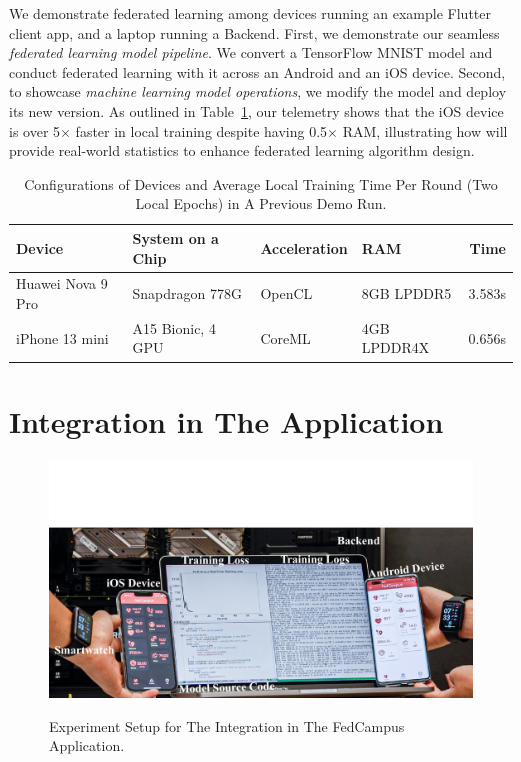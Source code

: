We demonstrate federated learning among
devices running an example Flutter client app,
and a laptop running a \fedkit Backend.
First, we demonstrate our seamless \textit{federated learning model pipeline}.
We convert a TensorFlow MNIST model and
conduct federated learning with it across an Android and an iOS device.
Second, to showcase \textit{machine learning model operations},
we modify the model and deploy its new version.
As outlined in Table~\ref{tbl:demo-stats},
our telemetry shows that
the iOS device is over 5$\times$ faster in local training despite
having 0.5$\times$ RAM,
illustrating how \fedkit will provide real-world statistics to
enhance federated learning algorithm design.

\begin{table}
    \centering
    \setlength{\tabcolsep}{4pt}
\begin{tabular}{llllr}
Device      & System on a Chip       & Acceleration        & RAM           & Time   \\\hline
Huawei Nova 9 Pro  & Snapdragon 778G   & OpenCL        & 8GB LPDDR5    & 3.583s \\
iPhone 13 mini   & A15 Bionic, 4 GPU & CoreML        & 4GB LPDDR4X   & 0.656s \\
\end{tabular}
\caption{Configurations of Devices and Average Local Training Time Per Round
    (Two Local Epochs) in A Previous Demo Run.
}
\label{tbl:demo-stats}
\end{table}

\section{\fedkit Integration in The \fedcampus Application}

\begin{figure}\begin{center}
    \label{fig:integration}
    \includegraphics[width=\linewidth]{fedcampus.pdf}
    \caption{Experiment Setup for The \fedkit Integration in The FedCampus
        Application.
    }
\end{center}\end{figure}

